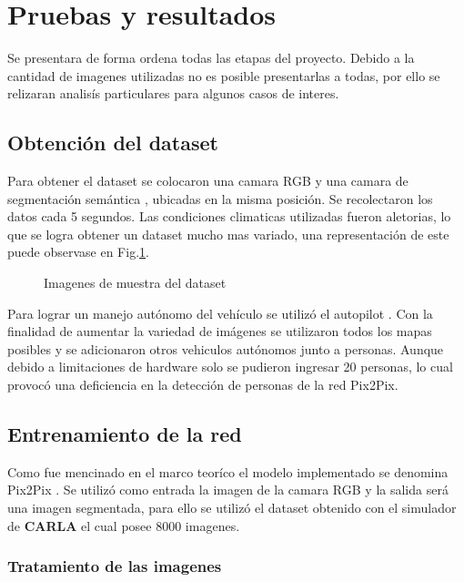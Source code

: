 \documentclass[]{IEEEtran}
\begin{document}
    \section{Pruebas y resultados}

    Se presentara de forma ordena todas las etapas del proyecto. 
    Debido a la cantidad de imagenes utilizadas no es posible presentarlas a todas, por ello 
    se relizaran analisís particulares para algunos casos de interes.

    \subsection{Obtención del dataset}

    Para obtener el dataset se colocaron una camara RGB y una camara de segmentación semántica
    \cite{CARLA-Sensors-Reference}, ubicadas en la misma posición. Se recolectaron los datos 
    cada 5 segundos. Las condiciones climaticas utilizadas fueron aletorias, lo que se logra
    obtener un dataset mucho mas variado, una representación de este puede observase en 
    Fig.\ref{fig:dataset}.

    \begin{figure}
        \centering
        \caption{Imagenes de muestra del dataset}
        \label{fig:dataset}
    \end{figure}

    Para lograr un manejo autónomo del vehículo se utilizó el autopilot \cite{CARLA-Documentation}. 
    Con la finalidad de aumentar la variedad de imágenes se utilizaron todos los mapas posibles y 
    se adicionaron otros vehiculos autónomos junto a personas. Aunque debido 
    a limitaciones de hardware solo se pudieron ingresar 20 personas, lo cual 
    provocó una deficiencia en la detección de personas de la red Pix2Pix. 

    \subsection{Entrenamiento de la red}

    Como fue mencinado en el marco teoríco el modelo implementado se denomina Pix2Pix \cite{Pix2Pix}.
    Se utilizó como entrada la imagen de la camara RGB y la salida será una imagen segmentada, para ello se utilizó
    el dataset obtenido con el simulador de \textbf{CARLA} el cual posee 8000 imagenes. 

    \subsubsection{Tratamiento de las imagenes}
\end{document}
